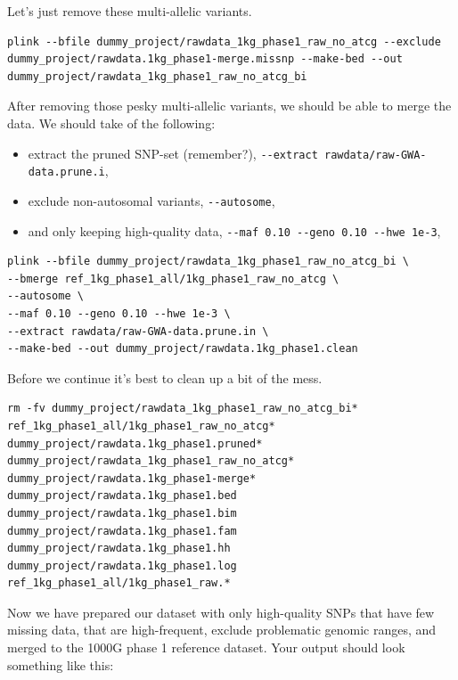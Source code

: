 \documentclass[
]{book}
\newcommand{\passthrough}[1]{#1}
\providecommand{\tightlist}{%
  \setlength{\itemsep}{0pt}\setlength{\parskip}{0pt}}
\begin{document}
Let's just remove these multi-allelic variants.

\begin{lstlisting}
plink --bfile dummy_project/rawdata_1kg_phase1_raw_no_atcg --exclude dummy_project/rawdata.1kg_phase1-merge.missnp --make-bed --out dummy_project/rawdata_1kg_phase1_raw_no_atcg_bi
\end{lstlisting}

After removing those pesky multi-allelic variants, we should be able to merge the data. We should take of the following:

\begin{itemize}
\tightlist
\item
  extract the pruned SNP-set (remember?), \passthrough{\lstinline!--extract rawdata/raw-GWA-data.prune.i!},
\item
  exclude non-autosomal variants, \passthrough{\lstinline!--autosome!},
\item
  and only keeping high-quality data, \passthrough{\lstinline!--maf 0.10 --geno 0.10 --hwe 1e-3!},
\end{itemize}

\begin{lstlisting}
plink --bfile dummy_project/rawdata_1kg_phase1_raw_no_atcg_bi \
--bmerge ref_1kg_phase1_all/1kg_phase1_raw_no_atcg \
--autosome \
--maf 0.10 --geno 0.10 --hwe 1e-3 \
--extract rawdata/raw-GWA-data.prune.in \
--make-bed --out dummy_project/rawdata.1kg_phase1.clean
\end{lstlisting}

Before we continue it's best to clean up a bit of the mess.

\begin{lstlisting}
rm -fv dummy_project/rawdata_1kg_phase1_raw_no_atcg_bi* ref_1kg_phase1_all/1kg_phase1_raw_no_atcg* dummy_project/rawdata.1kg_phase1.pruned* dummy_project/rawdata_1kg_phase1_raw_no_atcg* dummy_project/rawdata.1kg_phase1-merge* dummy_project/rawdata.1kg_phase1.bed dummy_project/rawdata.1kg_phase1.bim dummy_project/rawdata.1kg_phase1.fam dummy_project/rawdata.1kg_phase1.hh dummy_project/rawdata.1kg_phase1.log ref_1kg_phase1_all/1kg_phase1_raw.*
\end{lstlisting}

Now we have prepared our dataset with only high-quality SNPs that have few missing data, that are high-frequent, exclude problematic genomic ranges, and merged to the 1000G phase 1 reference dataset. Your output should look something like this:
\end{document}
